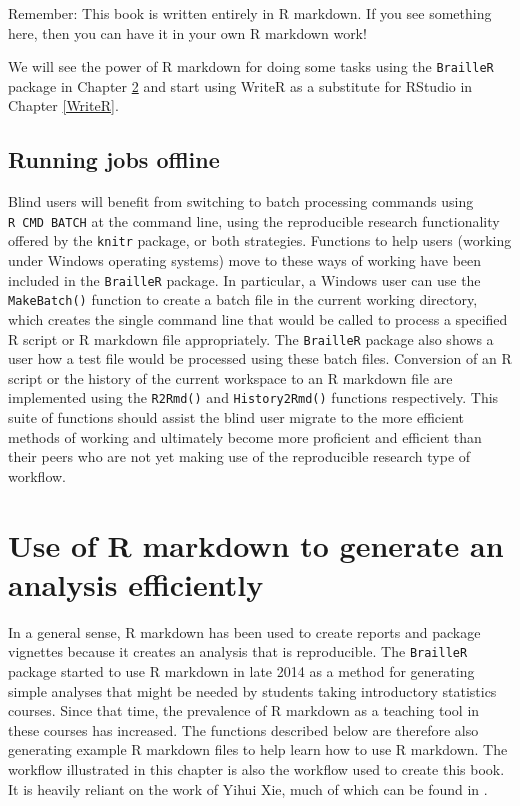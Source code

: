 \documentclass[
]{book}
\begin{document}
Remember: This book is written entirely in R markdown. If you see something here, then you can have it in your own R markdown work!

We will see the power of R markdown for doing some tasks using the \texttt{BrailleR} package in Chapter \ref{RMarkdown} and start using WriteR as a substitute for RStudio in Chapter \ref{WriteR}.

\hypertarget{running-jobs-offline}{%
\section{Running jobs offline}\label{running-jobs-offline}}

Blind users will benefit from switching to batch processing commands using \texttt{R\ CMD\ BATCH} at the command line, using the reproducible research functionality offered by the \texttt{knitr} package, or both strategies. Functions to help users (working under Windows operating systems) move to these ways of working have been included in the \texttt{BrailleR} package. In particular, a Windows user can use the \texttt{MakeBatch()} function to create a batch file in the current working directory, which creates the single command line that would be called to process a specified R script or R markdown file appropriately. The \texttt{BrailleR} package also shows a user how a test file would be processed using these batch files. Conversion of an R script or the history of the current workspace to an R markdown file are implemented using the \texttt{R2Rmd()} and \texttt{History2Rmd()} functions respectively. This suite of functions should assist the blind user migrate to the more efficient methods of working and ultimately become more proficient and efficient than their peers who are not yet making use of the reproducible research type of workflow.

\hypertarget{RMarkdown}{%
\chapter{Use of R markdown to generate an analysis efficiently}\label{RMarkdown}}

In a general sense, R markdown has been used to create reports and package vignettes because it creates an analysis that is reproducible. The \texttt{BrailleR} package started to use R markdown in late 2014 as a method for generating simple analyses that might be needed by students taking introductory statistics courses. Since that time, the prevalence of R markdown as a teaching tool in these courses has increased. The functions described below are therefore also generating example R markdown files to help learn how to use R markdown. The workflow illustrated in this chapter is also the workflow used to create this book. It is heavily reliant on the work of Yihui Xie, much of which can be found in \citep{Xie2015}.
\end{document}
